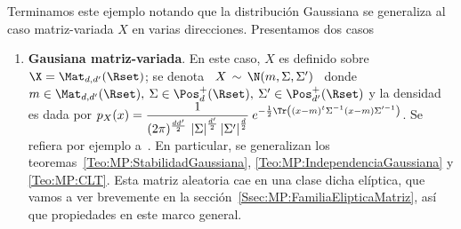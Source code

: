 Terminamos este ejemplo notando que la distribuci\'on Gaussiana se generaliza al
caso matriz-variada $X$ en varias direcciones. Presentamos dos casos
%
\begin{enumerate}
\item {\bf  Gausiana matriz-variada}. En este  caso, $X$ es definido  sobre $\X =
  \Mat_{d,d'}(\Rset)$; se denota \ $X \, \sim \, \N(m,\Sigma,\Sigma')$ \ donde \
  $m  \in \Mat_{d,d'}(\Rset),  \:  \Sigma \in  \Pos_d^+(\Rset),  \: \Sigma'  \in
  \Pos_{d'}^+(\Rset)$  y  la  densidad  es  dada  por  $\displaystyle  p_X(x)  =
  \frac{1}{(2  \pi)^{\frac{d  d'}{2}}  \, \left|  \Sigma  \right|^{\frac{d'}{2}}
    \left|  \Sigma'  \right|^{\frac{d}{2}}} \:  e^{-\frac12  \Tr \left(  (x-m)^t
      \Sigma^{-1}  (x-m)   \Sigma'^{-1}  \right)}$.   Se   refiera  por  ejemplo
  a~\cite{GupNag99,  KotNad04,  Daw81}.    En  particular,  se  generalizan  los
  teoremas~\ref{Teo:MP:StabilidadGaussiana}, \ref{Teo:MP:IndependenciaGaussiana}
  y \ref{Teo:MP:CLT}. Esta  matriz aleatoria cae en una  clase dicha el\'iptica,
  que         vamos        a         ver         brevemente        en         la
  secci\'on~\ref{Ssec:MP:FamiliaElipticaMatriz},  as\'i que propiedades  en este
  marco general.
%


\end{enumerate}
